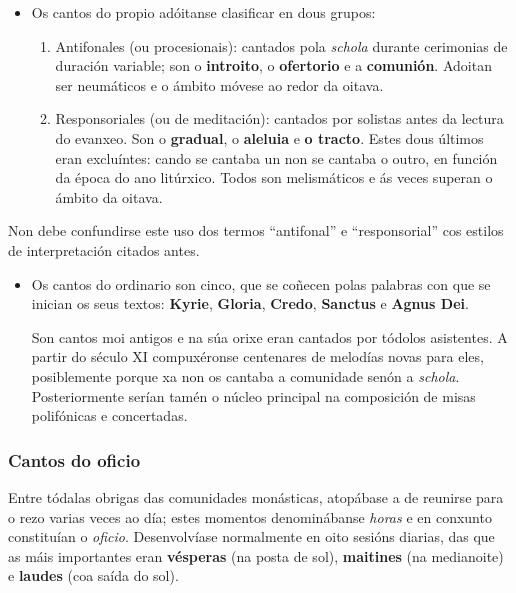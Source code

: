 \documentclass[a4paper, twoside]{templates/ociamthesis}
\providecommand{\tightlist}{%
  \setlength{\itemsep}{0pt}\setlength{\parskip}{0pt}}
\begin{document}
\begin{itemize}
\item
  Os cantos do propio adóitanse clasificar en dous grupos:

  \begin{enumerate}
  \def\labelenumi{\arabic{enumi}.}
  \tightlist
  \item
    Antifonales (ou procesionais): cantados pola \emph{schola} durante cerimonias de duración variable; son o \textbf{introito}, o \textbf{ofertorio} e a \textbf{comunión}. Adoitan ser neumáticos e o ámbito móvese ao redor da oitava.
  \item
    Responsoriales (ou de meditación): cantados por solistas antes da lectura do evanxeo. Son o \textbf{gradual}, o \textbf{aleluia} e \textbf{o tracto}. Estes dous últimos eran excluíntes: cando se cantaba un non se cantaba o outro, en función da época do ano litúrxico. Todos son melismáticos e ás veces superan o ámbito da oitava.
  \end{enumerate}
\end{itemize}

Non debe confundirse este uso dos termos ``antifonal'' e ``responsorial'' cos estilos de interpretación citados antes.

\begin{itemize}
\item
  Os cantos do ordinario son cinco, que se coñecen polas palabras con que se inician os seus textos: \textbf{Kyrie}, \textbf{Gloria}, \textbf{Credo}, \textbf{Sanctus} e \textbf{Agnus Dei}.

  Son cantos moi antigos e na súa orixe eran cantados por tódolos asistentes. A partir do século XI compuxéronse centenares de melodías novas para eles, posiblemente porque xa non os cantaba a comunidade senón a \emph{schola}. Posteriormente serían tamén o núcleo principal na composición de misas polifónicas e concertadas.
\end{itemize}

\hypertarget{cantos-do-oficio}{%
\subsubsection{Cantos do oficio}\label{cantos-do-oficio}}

Entre tódalas obrigas das comunidades monásticas, atopábase a de reunirse para o rezo varias veces ao día; estes momentos denominábanse \emph{horas} e en conxunto constituían o \emph{oficio}. Desenvolvíase normalmente en oito sesións diarias, das que as máis importantes eran \textbf{vésperas} (na posta de sol), \textbf{maitines} (na medianoite) e \textbf{laudes} (coa saída do sol).
\end{document}
